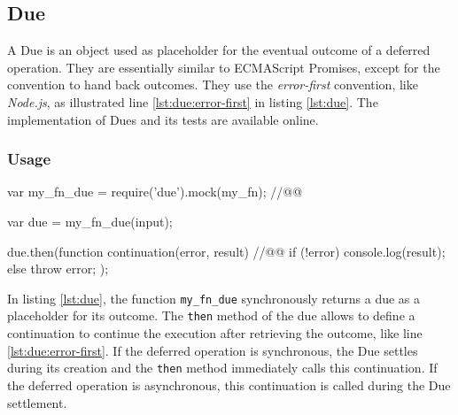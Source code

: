 
\subsection{Due} \label{chapter5:due:definition}

A Due is an object used as placeholder for the eventual outcome of a deferred operation.
They are essentially similar to ECMAScript Promises, except for the convention to hand back outcomes.
They use the \textit{error-first} convention, like \textit{Node.js}, as illustrated line \ref{lst:due:error-first} in listing \ref{lst:due}.
The implementation of Dues and its tests are available online.

\subsubsection{Usage}

\begin{code}[js, %
             caption={Example of a due}, %
             label={lst:due}] %
var my_fn_due = require('due').mock(my_fn); //@\label{lst:due:mock}@

var due = my_fn_due(input);

due.then(function continuation(error, result) { //@\label{lst:due:error-first}@
  if (!error) {
    console.log(result);
  } else {
    throw error;
  }
});
\end{code}


In listing \ref{lst:due}, the function \texttt{my\_fn\_due} synchronously returns a due as a placeholder for its outcome.
The \texttt{then} method of the due allows to define a continuation to continue the execution after retrieving the outcome, like line \ref{lst:due:error-first}.
If the deferred operation is synchronous, the Due settles during its creation and the \texttt{then} method immediately calls this continuation.
If the deferred operation is asynchronous, this continuation is called during the Due settlement.


